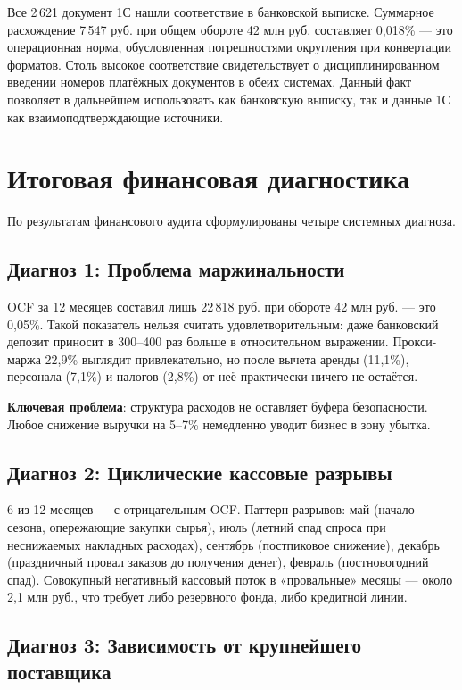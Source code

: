 Все 2\,621 документ 1С нашли соответствие в банковской выписке. Суммарное расхождение 7\,547 руб. при общем обороте 42 млн руб. составляет 0,018\% --- это операционная норма, обусловленная погрешностями округления при конвертации форматов. Столь высокое соответствие свидетельствует о дисциплинированном введении номеров платёжных документов в обеих системах. Данный факт позволяет в дальнейшем использовать как банковскую выписку, так и данные 1С как взаимоподтверждающие источники.

\section{Итоговая финансовая диагностика}

По результатам финансового аудита сформулированы четыре системных диагноза.

\subsection{Диагноз 1: Проблема маржинальности}

OCF за 12 месяцев составил лишь 22\,818 руб. при обороте 42 млн руб. --- это 0,05\%. Такой показатель нельзя считать удовлетворительным: даже банковский депозит приносит в 300--400 раз больше в относительном выражении. Прокси-маржа 22,9\% выглядит привлекательно, но после вычета аренды (11,1\%), персонала (7,1\%) и налогов (2,8\%) от неё практически ничего не остаётся.

\textbf{Ключевая проблема}: структура расходов не оставляет буфера безопасности. Любое снижение выручки на 5--7\% немедленно уводит бизнес в зону убытка.

\subsection{Диагноз 2: Циклические кассовые разрывы}

6 из 12 месяцев --- с отрицательным OCF. Паттерн разрывов: май (начало сезона, опережающие закупки сырья), июль (летний спад спроса при неснижаемых накладных расходах), сентябрь (постпиковое снижение), декабрь (праздничный провал заказов до получения денег), февраль (постновогодний спад). Совокупный негативный кассовый поток в «провальные» месяцы --- около 2,1 млн руб., что требует либо резервного фонда, либо кредитной линии.

\subsection{Диагноз 3: Зависимость от крупнейшего поставщика}

